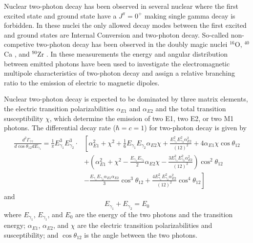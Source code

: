 \documentclass[cnatzke_thesis_proposal.tex]{subfiles}
\begin{document}
Nuclear two-photon decay has been observed in several nuclear where the first excited state and ground state have a $J^{\pi} = 0^+$ making single gamma decay is forbidden. 
In these nuclei the only allowed decay modes between the first excited and ground states are Internal Conversion and two-photon decay. 
So-called non-competive two-photon decay has been observed in the doubly magic nuclei $^{16}$O, $^{40}$Ca \cite{schirmer_double_1984}, and $^{90}$Zr \cite{schirmer_double_1984}. 
In these measurements the energy and angular distribution between emitted photons have been used to investigate the electromagnetic multipole characteristics of two-photon decay and assign a relative branching ratio to the emission of electric to magnetic dipoles. 

Nuclear two-photon decay is expected to be dominated by three matrix elements, the electric transition polarizabilities $\alpha_{E1}$ and $\alpha_{E2}$ and the total transition susceptibility $\chi$, which determine the emission of two E1, two E2, or two M1 photons. \cite{kramp_nuclear_1987}
The differential decay rate ($\hbar = c = 1$) for two-photon decay is given by 
\begin{align} \label{eqn:diff_decay_rate_full}
    \begin{split}
    \frac{d^2\Gamma_{\gamma\gamma}}{d \cos\theta_{12} dE_{\gamma_1}} = \frac{1}{\pi} E_{\gamma_1}^3 E_{\gamma_2}^3 \cdot & \left[ \alpha^2_{E1} + \chi^2 + \frac{1}{6} E_{\gamma_1} E_{\gamma_2} \alpha_{E2} \chi + \frac{E_{\gamma_1}^2 E_{\gamma_2}^2 \alpha_{E2}^2}{(12)^2} + 4 \alpha_{E1} \chi \cos\theta_{12} \right. \\ 
    &\left. + \left(\alpha_{E1}^2 + \chi^2 - \frac{E_{\gamma_1} E_{\gamma_2}}{2} \alpha_{E2} \chi - \frac{3 E_{\gamma_1}^2 E_{\gamma_2}^2 \alpha_{E2}^2}{(12)^2}\right) \cos^2\theta_{12} \right. \\
    &\left. - \frac{E_{\gamma_1} E_{\gamma_2} \alpha_{E1} \alpha_{E2}}{3} \cos^3\theta_{12} + \frac{4 E_{\gamma_1}^2 E_{\gamma_2}^2 \alpha_{E2}^2}{(12)^2} \cos^4\theta_{12} \right]
    \end{split}
\end{align}
and     
\begin{equation} \label{eqn:two_photon_energy_sum}
    E_{\gamma_1} + E_{\gamma_2} = E_0
\end{equation}
where $E_{\gamma_1}$, $E_{\gamma_1}$, and $E_{0}$ are the energy of the two photons and the transition energy; $\alpha_{E1}$, $\alpha_{E2}$, and $\chi$ are the electric transition polarizabilities and susceptibility; and $\cos\theta_{12}$ is the angle between the two photons. 
\end{document}

